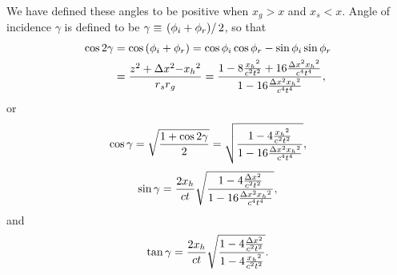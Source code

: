We have defined these angles to be positive when \(x_g>x\) and \(x_s<x\). Angle of incidence $\gamma $ is defined to be \(\gamma \equiv \left.\left(\phi
_{\text{\textit{$i$}}}+\phi _{\text{\textit{$r$}}}\right)\right/2\), so that
\begin{align}\cos  2\gamma &=\cos  \left(\phi _{\text{\textit{$i$}}}+\phi _{\text{\textit{$r$}}}\right)=\cos  \phi _{\text{\textit{$i$}}}\cos
\phi _{\text{\textit{$r$}}}-\sin  \phi _{\text{\textit{$i$}}} \sin  \phi _{\text{\textit{$r$}}}\nonumber\\
&=\frac{\text{\textit{$z$}}^2\text{\textit{$ $}}+\Delta \text{\textit{$x$}}^2\text{\textit{$-$}}\text{\textit{$x_h$}}{}^2}{\text{\textit{$r$}}_{\text{\textit{$s$}}}\text{\textit{$r$}}_{\text{\textit{$g$}}}}=\frac{1-8
\frac{\text{\textit{$ $}}\text{\textit{$x_h$}}{}^2}{\text{\textit{$c$}}^2\text{\textit{$ $}}\text{\textit{$t$}}^2}+16\frac{\Delta \text{\textit{$x$}}^2\text{\textit{$
$}}\text{\textit{$x_h$}}{}^2}{\text{\textit{$c$}}^4\text{\textit{$ $}}\text{\textit{$t$}}^4}}{1-16\frac{\Delta \text{\textit{$x$}}^2\text{\textit{$
$}}\text{\textit{$x_h$}}{}^2}{\text{\textit{$c$}}^4\text{\textit{$ $}}\text{\textit{$t$}}^4}},
\end{align}
or
\begin{equation}\cos  \gamma =\sqrt{\frac{1 + \cos  2\gamma }{2}}=\sqrt{\frac{1 -4 \frac{\text{\textit{$ $}}\text{\textit{$x_h$}}{}^2}{\text{\textit{$c$}}^2\text{\textit{$
$}}\text{\textit{$t$}}^2}}{1-16\frac{\Delta \text{\textit{$x$}}^2\text{\textit{$ $}}\text{\textit{$x_h$}}{}^2}{\text{\textit{$c$}}^4\text{\textit{$
$}}\text{\textit{$t$}}^4}}},\end{equation}
\begin{equation}\sin  \gamma =\frac{2\text{\textit{$ $}}\text{\textit{$x_h$}}}{\text{\textit{$c t$}}}\sqrt{\frac{1-4\frac{\Delta \text{\textit{$x$}}^2\text{\textit{$
$}}}{\text{\textit{$c$}}^2\text{\textit{$ $}}\text{\textit{$t$}}^2} }{1-16\frac{\Delta \text{\textit{$x$}}^2\text{\textit{$ $}}\text{\textit{$x_h$}}{}^2}{\text{\textit{$c$}}^4\text{\textit{$
$}}\text{\textit{$t$}}^4}}},\end{equation}
and
\begin{equation}\tan  \gamma =\frac{2\text{\textit{$ $}}\text{\textit{$x_h$}}}{\text{\textit{$c t$}}}\sqrt{\frac{1-4\frac{\Delta \text{\textit{$x$}}^2\text{\textit{$
$}}}{\text{\textit{$c$}}^2\text{\textit{$ $}}\text{\textit{$t$}}^2} }{1 -4 \frac{\text{\textit{$ $}}\text{\textit{$x_h$}}{}^2}{\text{\textit{$c$}}^2\text{\textit{$
$}}\text{\textit{$t$}}^2}}}.\end{equation}

